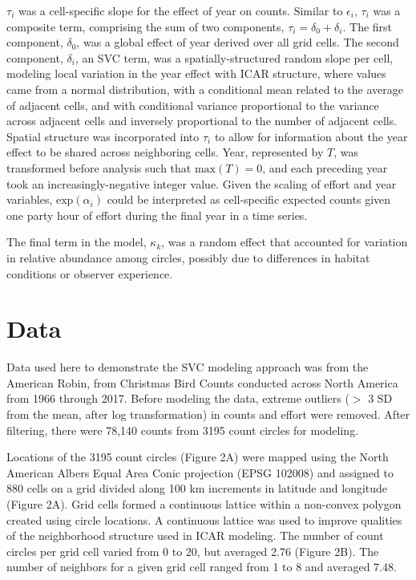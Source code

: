 \documentclass[]{article}
\begin{document}
$\tau_i$ was a cell-specific slope for the effect of year on counts. Similar to $\epsilon_i$, $\tau_i$ was a composite term, comprising the sum of two components, $\tau_i = \delta_0 + \delta_i$. The first component, $\delta_0$, was a global effect of year derived over all grid cells. The second component, $\delta_i$, an SVC term, was a spatially-structured random slope per cell, modeling local variation in the year effect with ICAR structure, where values came from a normal distribution, with a conditional mean related to the average of adjacent cells, and with conditional variance proportional to the variance across adjacent cells and inversely proportional to the number of adjacent cells. Spatial structure was incorporated into $\tau_i$ to allow for information about the year effect to be shared across neighboring cells. Year, represented by $T$, was transformed before analysis such that $\text{max}(T) = 0$, and each preceding year took an increasingly-negative integer value. Given the scaling of effort and year variables, $\text{exp}(\alpha_i)$ could be interpreted as cell-specific expected counts given one party hour of effort during the final year in a time series.

The final term in the model, $\kappa_{k}$, was a random effect that accounted for variation in relative abundance among circles, possibly due to differences in habitat conditions or observer experience.


\section{Data}
Data used here to demonstrate the SVC modeling approach was from the American Robin, from Christmas Bird Counts conducted across North America from 1966 through 2017. Before modeling the data, extreme outliers ($>$ 3 SD from the mean, after log transformation) in counts and effort were removed. After filtering, there were 78,140 counts from 3195 count circles for modeling.

Locations of the 3195 count circles (Figure 2A) were mapped using the North American Albers Equal Area Conic projection (EPSG 102008) and assigned to 880 cells on a grid divided along 100 km increments in latitude and longitude (Figure 2A). Grid cells formed a continuous lattice within a non-convex polygon created using circle locations. A continuous lattice was used to improve qualities of the neighborhood structure used in ICAR modeling. The number of count circles per grid cell varied from 0 to 20, but averaged 2.76 (Figure 2B). The number of neighbors for a given grid cell ranged from 1 to 8 and averaged 7.48.
\end{document}
